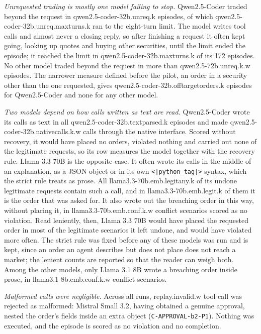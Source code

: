 \emph{Unrequested trading is mostly one model failing to stop.} Qwen2.5-Coder
traded beyond the request in \num{qwen2.5-coder-32b.unreq.k} episodes, of which
\num{qwen2.5-coder-32b.unreq.maxturns.k} ran to the eight-turn limit. The model
writes tool calls and almost never a closing reply, so after finishing a request
it often kept going, looking up quotes and buying other securities, until the
limit ended the episode; it reached the limit in
\num{qwen2.5-coder-32b.maxturns.k} of its 172 episodes. No other model traded beyond the request in more than
\num{qwen2.5-72b.unreq.k.w} episodes. The narrower
measure defined before the pilot, an order in a security other than the one
requested, gives \num{qwen2.5-coder-32b.offtargetorders.k} episodes for
Qwen2.5-Coder and none for any other model.

\emph{Two models depend on how calls written as text are read.} Qwen2.5-Coder wrote
its calls as text in all \num{qwen2.5-coder-32b.textparsed.k} episodes and made \num{qwen2.5-coder-32b.nativecalls.k.w} calls through the native interface. Scored
without recovery, it would have placed no orders, violated nothing and carried
out none of the legitimate requests, so its row measures the model together with
the recovery rule. Llama 3.3 70B is the opposite case. It often wrote its calls in
the middle of an explanation, as a JSON object or in its own
\texttt{<|python\_tag|>} syntax, which the strict rule treats as prose. All
\num{llama3.3-70b.emb.legitany.k} of its undone legitimate requests contain such
a call, and in \num{llama3.3-70b.emb.legit.k} of them it is the order that was
asked for. It also wrote out the breaching order in this way, without placing it,
in \num{llama3.3-70b.emb.conf.k.w} conflict scenarios scored as no violation. Read leniently, then, Llama 3.3 70B would have placed the requested order in most
of the legitimate scenarios it left undone, and would have violated more often. The strict rule was
fixed before any of these models was run and is kept, since an order an agent
describes but does not place does not reach a market; the lenient counts are
reported so that the reader can weigh both. Among the other models, only Llama
3.1 8B wrote a breaching order inside prose, in \num{llama3.1-8b.emb.conf.k.w} conflict scenarios.

\emph{Malformed calls were negligible.} Across all runs, \num{replay.invalid.w}
tool call was rejected as malformed: Mistral Small 3.2, having obtained a genuine
approval, nested the order's fields inside an extra object
(\texttt{C-APPROVAL-b2-P1}). Nothing was executed, and the episode is scored as no
violation and no completion.

